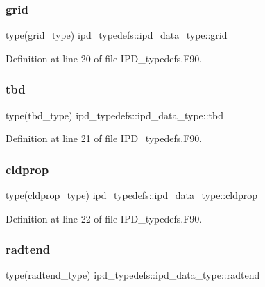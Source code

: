 \subsubsection{grid}
{\footnotesize\ttfamily type(grid\+\_\+type) ipd\+\_\+typedefs\+::ipd\+\_\+data\+\_\+type\+::grid}



Definition at line 20 of file I\+P\+D\+\_\+typedefs.\+F90.

\mbox{\label{structipd__typedefs_1_1ipd__data__type_aeb649dd881524c43916593d06c7ddd61}} 
\subsubsection{tbd}
{\footnotesize\ttfamily type(tbd\+\_\+type) ipd\+\_\+typedefs\+::ipd\+\_\+data\+\_\+type\+::tbd}



Definition at line 21 of file I\+P\+D\+\_\+typedefs.\+F90.

\mbox{\label{structipd__typedefs_1_1ipd__data__type_a60129fa69f334b2d283334c21f9ba860}} 
\subsubsection{cldprop}
{\footnotesize\ttfamily type(cldprop\+\_\+type) ipd\+\_\+typedefs\+::ipd\+\_\+data\+\_\+type\+::cldprop}



Definition at line 22 of file I\+P\+D\+\_\+typedefs.\+F90.

\mbox{\label{structipd__typedefs_1_1ipd__data__type_a6f936607063239d8aeb4c9ef26a404df}} 
\subsubsection{radtend}
{\footnotesize\ttfamily type(radtend\+\_\+type) ipd\+\_\+typedefs\+::ipd\+\_\+data\+\_\+type\+::radtend}



